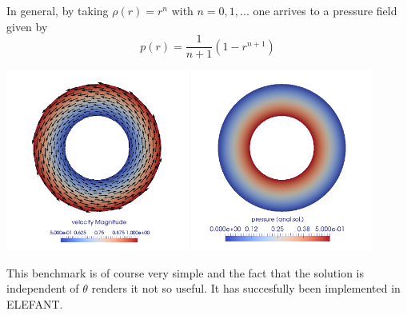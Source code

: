 In general, by taking $\rho(r)=r^n$ with $n=0,1,...$ one arrives to a pressure field given by 
\[
\boxed{
p(r)=\frac{1}{n+1} (1- r^{n+1})
}
\]

\begin{center}
\includegraphics[width=6cm]{images/benchmark_annulus_mms/vel}
\includegraphics[width=6cm]{images/benchmark_annulus_mms/press}
\end{center}

This benchmark is of course very simple and the fact that the solution is independent of $\theta$
renders it not so useful. It has succesfully been implemented in ELEFANT.




